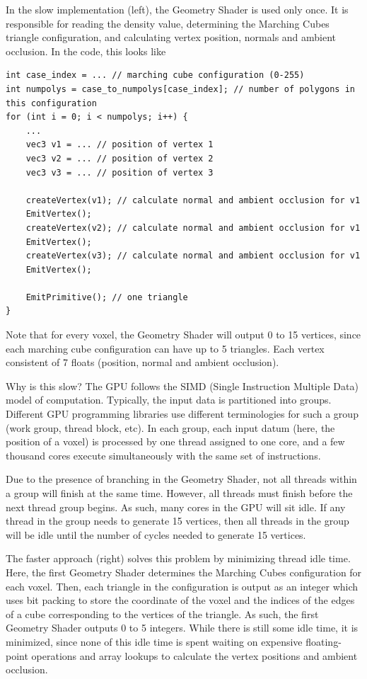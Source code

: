 \documentclass {article}
\begin{document}
In the slow implementation (left), the Geometry Shader is used only once. It is responsible for reading the density value, determining the Marching Cubes triangle configuration, and calculating vertex position, normals and ambient occlusion. In the code, this looks like

\begin{lstlisting}
int case_index = ... // marching cube configuration (0-255)
int numpolys = case_to_numpolys[case_index]; // number of polygons in this configuration
for (int i = 0; i < numpolys; i++) {
    ...
    vec3 v1 = ... // position of vertex 1
    vec3 v2 = ... // position of vertex 2
    vec3 v3 = ... // position of vertex 3

    createVertex(v1); // calculate normal and ambient occlusion for v1
    EmitVertex();
    createVertex(v2); // calculate normal and ambient occlusion for v1
    EmitVertex();
    createVertex(v3); // calculate normal and ambient occlusion for v1
    EmitVertex();

    EmitPrimitive(); // one triangle
}
\end{lstlisting}

Note that for every voxel, the Geometry Shader will output 0 to 15 vertices, since each marching cube configuration can have up to 5 triangles. Each vertex consistent of 7 floats (position, normal and ambient occlusion).

Why is this slow? The GPU follows the SIMD (Single Instruction Multiple Data) model of computation. Typically, the input data is partitioned into groups. Different GPU programming libraries use different terminologies for such a group (work group, thread block, etc). In each group, each input datum (here, the position of a voxel) is processed by one thread assigned to one core, and a few thousand cores execute simultaneously with the same set of instructions.

Due to the presence of branching in the Geometry Shader, not all threads within a group will finish at the same time. However, all threads must finish before the next thread group begins. As such, many cores in the GPU will sit idle. If any thread in the group needs to generate 15 vertices, then all threads in the group will be idle until the number of cycles needed to generate 15 vertices.

The faster approach (right) solves this problem by minimizing thread idle time. Here, the first Geometry Shader determines the Marching Cubes configuration for each voxel. Then, each triangle in the configuration is output as an integer which uses bit packing to store the coordinate of the voxel and the indices of the edges of a cube corresponding to the vertices of the triangle. As such, the first Geometry Shader outputs 0 to 5 integers. While there is still some idle time, it is minimized, since none of this idle time is spent waiting on expensive floating-point operations and array lookups to calculate the vertex positions and ambient occlusion.
\end{document}
